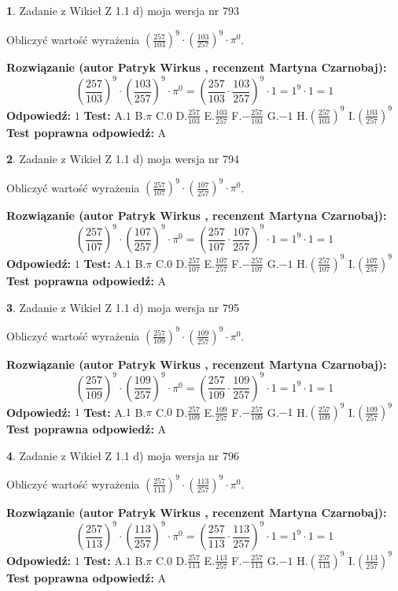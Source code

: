 \documentclass[12pt, a4paper]{article}
\theoremstyle{definition} %
\newtheorem{zad}{}
\newcommand{\zadStart}[1]{\begin{zad}#1\newline}
\newcommand{\zadStop}{\end{zad}}
\newcommand{\rozwStart}[2]{\noindent \textbf{Rozwiązanie (autor #1 , recenzent #2): }\newline}
\newcommand{\rozwStop}{\newline}
\newcommand{\odpStart}{\noindent \textbf{Odpowiedź:}\newline}
\newcommand{\odpStop}{\newline}
\newcommand{\testStart}{\noindent \textbf{Test:}\newline}
\newcommand{\testStop}{\newline}
\newcommand{\kluczStart}{\noindent \textbf{Test poprawna odpowiedź:}\newline}
\newcommand{\kluczStop}{\newline}
\begin{document}
\zadStart{Zadanie z Wikieł Z 1.1 d) moja wersja nr 793}

Obliczyć wartość wyrażenia $(\frac{257}{103})^{9} \cdot (\frac{103}{257})^{9} \cdot \pi^{0}$.
\zadStop
\rozwStart{Patryk Wirkus}{Martyna Czarnobaj}
$$(\frac{257}{103})^{9} \cdot (\frac{103}{257})^{9} \cdot \pi^{0} = (\frac{257}{103} \cdot \frac{103}{257})^{9} \cdot 1 = 1^{9} \cdot 1 = 1$$
\rozwStop
\odpStart
$1$
\odpStop
\testStart
A.$1$ B.$\pi$ C.$0$ D.$\frac{257}{103}$ E.$\frac{103}{257}$
F.$-\frac{257}{103}$ G.$-1$
H.$(\frac{257}{103})^{9}$
I.$(\frac{103}{257})^{9}$
\testStop
\kluczStart
A
\kluczStop



\zadStart{Zadanie z Wikieł Z 1.1 d) moja wersja nr 794}

Obliczyć wartość wyrażenia $(\frac{257}{107})^{9} \cdot (\frac{107}{257})^{9} \cdot \pi^{0}$.
\zadStop
\rozwStart{Patryk Wirkus}{Martyna Czarnobaj}
$$(\frac{257}{107})^{9} \cdot (\frac{107}{257})^{9} \cdot \pi^{0} = (\frac{257}{107} \cdot \frac{107}{257})^{9} \cdot 1 = 1^{9} \cdot 1 = 1$$
\rozwStop
\odpStart
$1$
\odpStop
\testStart
A.$1$ B.$\pi$ C.$0$ D.$\frac{257}{107}$ E.$\frac{107}{257}$
F.$-\frac{257}{107}$ G.$-1$
H.$(\frac{257}{107})^{9}$
I.$(\frac{107}{257})^{9}$
\testStop
\kluczStart
A
\kluczStop



\zadStart{Zadanie z Wikieł Z 1.1 d) moja wersja nr 795}

Obliczyć wartość wyrażenia $(\frac{257}{109})^{9} \cdot (\frac{109}{257})^{9} \cdot \pi^{0}$.
\zadStop
\rozwStart{Patryk Wirkus}{Martyna Czarnobaj}
$$(\frac{257}{109})^{9} \cdot (\frac{109}{257})^{9} \cdot \pi^{0} = (\frac{257}{109} \cdot \frac{109}{257})^{9} \cdot 1 = 1^{9} \cdot 1 = 1$$
\rozwStop
\odpStart
$1$
\odpStop
\testStart
A.$1$ B.$\pi$ C.$0$ D.$\frac{257}{109}$ E.$\frac{109}{257}$
F.$-\frac{257}{109}$ G.$-1$
H.$(\frac{257}{109})^{9}$
I.$(\frac{109}{257})^{9}$
\testStop
\kluczStart
A
\kluczStop



\zadStart{Zadanie z Wikieł Z 1.1 d) moja wersja nr 796}

Obliczyć wartość wyrażenia $(\frac{257}{113})^{9} \cdot (\frac{113}{257})^{9} \cdot \pi^{0}$.
\zadStop
\rozwStart{Patryk Wirkus}{Martyna Czarnobaj}
$$(\frac{257}{113})^{9} \cdot (\frac{113}{257})^{9} \cdot \pi^{0} = (\frac{257}{113} \cdot \frac{113}{257})^{9} \cdot 1 = 1^{9} \cdot 1 = 1$$
\rozwStop
\odpStart
$1$
\odpStop
\testStart
A.$1$ B.$\pi$ C.$0$ D.$\frac{257}{113}$ E.$\frac{113}{257}$
F.$-\frac{257}{113}$ G.$-1$
H.$(\frac{257}{113})^{9}$
I.$(\frac{113}{257})^{9}$
\testStop
\kluczStart
A
\kluczStop
\end{document}
